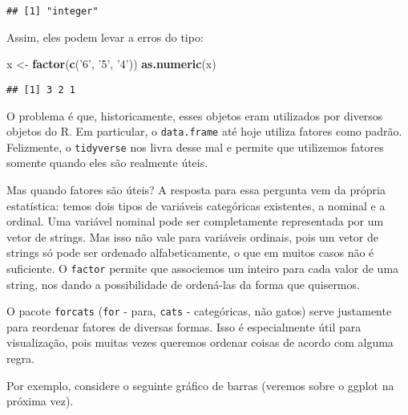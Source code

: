 \documentclass[]{book}
\newenvironment{Shaded}{\begin{snugshade}}{\end{snugshade}}
\newcommand{\KeywordTok}[1]{\textcolor[rgb]{0.13,0.29,0.53}{\textbf{{#1}}}}
\newcommand{\DecValTok}[1]{\textcolor[rgb]{0.00,0.00,0.81}{{#1}}}
\newcommand{\StringTok}[1]{\textcolor[rgb]{0.31,0.60,0.02}{{#1}}}
\newcommand{\NormalTok}[1]{{#1}}
\begin{document}
\begin{verbatim}
## [1] "integer"
\end{verbatim}

Assim, eles podem levar a erros do tipo:

\begin{Shaded}
\begin{Highlighting}[]
\NormalTok{x <-}\StringTok{ }\KeywordTok{factor}\NormalTok{(}\KeywordTok{c}\NormalTok{(}\StringTok{'6'}\NormalTok{, }\StringTok{'5'}\NormalTok{, }\StringTok{'4'}\NormalTok{))}
\KeywordTok{as.numeric}\NormalTok{(x)}
\end{Highlighting}
\end{Shaded}

\begin{verbatim}
## [1] 3 2 1
\end{verbatim}

O problema é que, historicamente, esses objetos eram utilizados por
diversos objetos do R. Em particular, o \texttt{data.frame} até hoje
utiliza fatores como padrão. Felizmente, o \texttt{tidyverse} nos livra
desse mal e permite que utilizemos fatores somente quando eles são
realmente úteis.

Mas quando fatores são úteis? A resposta para essa pergunta vem da
própria estatística: temos dois tipos de variáveis categóricas
existentes, a nominal e a ordinal. Uma variável nominal pode ser
completamente representada por um vetor de strings. Mas isso não vale
para variáveis ordinais, pois um vetor de strings só pode ser ordenado
alfabeticamente, o que em muitos casos não é suficiente. O
\texttt{factor} permite que associemos um inteiro para cada valor de uma
string, nos dando a possibilidade de ordená-las da forma que quisermos.

O pacote \texttt{forcats} (\texttt{for} - para, \texttt{cats} -
categóricas, não gatos) serve justamente para reordenar fatores de
diversas formas. Isso é especialmente útil para visualização, pois
muitas vezes queremos ordenar coisas de acordo com alguma regra.

Por exemplo, considere o seguinte gráfico de barras (veremos sobre o
ggplot na próxima vez).

\begin{Shaded}
\end{Shaded}
\end{document}

